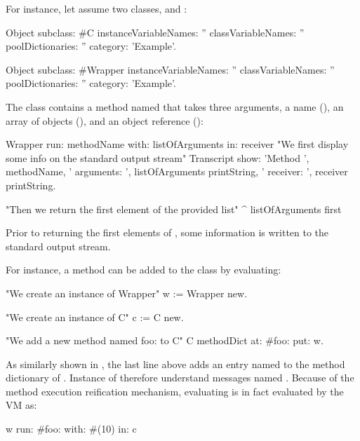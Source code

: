 \documentclass[a4paper,10pt,twoside]{book}
\begin{document}
For instance, let assume two classes,  and :

\begin{code}{}
Object subclass: #C
	instanceVariableNames: ''
	classVariableNames: ''
	poolDictionaries: ''
	category: 'Example'.
 
Object subclass: #Wrapper
	instanceVariableNames: ''
	classVariableNames: ''
	poolDictionaries: ''
	category: 'Example'.
\end{code}

The class  contains a method named  that takes three arguments, a name (), an array of objects (), and an object reference ():

\begin{code}{}
Wrapper \stSelector run: methodName with: listOfArguments in: receiver
	"We first display some info on the standard output stream"
	Transcript show: 'Method ', methodName,
		' arguments: ', listOfArguments printString,
		' receiver: ', receiver printString.

	"Then we return the first element of the provided list"
	^ listOfArguments first
\end{code}

Prior to returning the first elements of , some information is written to the standard output stream.

For instance, a method  can be added to the class  by evaluating:

\begin{code}{}
"We create an instance of Wrapper"
w := Wrapper new.

"We create an instance of C"
c := C new.

"We add a new method named foo: to C"
C methodDict at: #foo: put: w.
\end{code}

As similarly shown in , the last line above adds an entry named  to the method dictionary of . Instance of  therefore understand messages named . Because of the method execution reification mechanism, evaluating  is in fact evaluated by the VM as:

\begin{code}{}
w run: #foo: with: #(10) in: c
\end{code}
\end{document}
